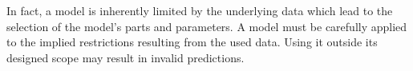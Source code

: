 
In fact, a model is inherently limited by the underlying data which lead to the selection of the model's parts and parameters.
A model must be carefully applied to the implied restrictions resulting from the used data.
Using it outside its designed scope may result in invalid predictions.
